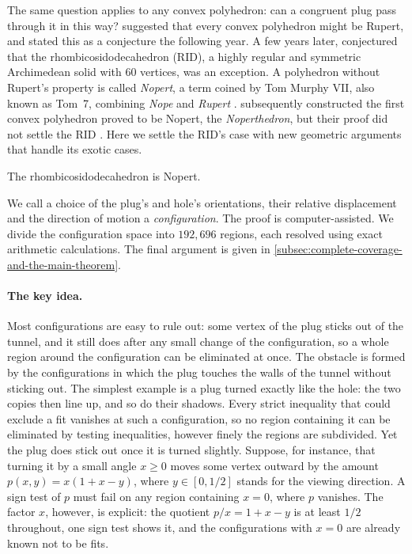 The same question applies to any convex polyhedron: can a congruent plug
pass through it in this way? \citet{JerrardWetzelYuan2017}
suggested that every convex polyhedron might be Rupert, and
\citet{ChaiYuanZamfirescu2018} stated this as a conjecture the following year.
A few years later, \citet{SteiningerYurkevich2023} conjectured that the
rhombicosidodecahedron (RID), a highly regular and symmetric Archimedean
solid with 60 vertices, was an exception. A polyhedron without Rupert's property is called \emph{Nopert}, a term
coined by Tom Murphy VII, also known as Tom~7, combining \emph{Nope} and
\emph{Rupert} \citep[p.~352]{Murphy2025}.
\citet{SteiningerYurkevichNopertV2} subsequently constructed the first convex polyhedron
proved to be Nopert, the \emph{Noperthedron}, but their proof did not settle
the RID \citep[Section~9.1]{SteiningerYurkevichNopertV2}.
Here we settle the RID's case with new geometric arguments that handle
its exotic cases.

\begin{theorem}\label{thm:main}
  The rhombicosidodecahedron is Nopert.
\end{theorem}

We call a choice of the plug's and hole's orientations, their relative displacement
and the direction of motion a \emph{configuration}.
The proof is computer-assisted. We divide the configuration space into
$192{,}696$ regions, each resolved using exact arithmetic calculations.
The final argument is given in
\cref{subsec:complete-coverage-and-the-main-theorem}.

\paragraph{The key idea.}
Most configurations are easy to rule out: some vertex of the plug sticks
out of the tunnel, and it still does after any small change of the
configuration, so a whole region around the configuration can be
eliminated at once. The obstacle is formed by the configurations in which
the plug touches the walls of the tunnel without sticking out. The
simplest example is a plug turned exactly like the hole: the two copies
then line up, and so do their shadows. Every strict inequality that could
exclude a fit vanishes at such a configuration, so no region containing
it can be eliminated by testing inequalities, however finely the regions
are subdivided. Yet the plug does stick out once it is turned slightly.
Suppose, for instance, that turning it by a small angle $x\ge0$ moves some
vertex outward by the amount $p(x,y)=x(1+x-y)$, where $y\in[0,1/2]$ stands
for the viewing direction. A sign test of $p$ must fail on any region
containing $x=0$, where $p$ vanishes. The factor $x$, however, is explicit:
the quotient $p/x=1+x-y$ is at least $1/2$ throughout, one sign test shows
it, and the configurations with $x=0$ are already known not to be fits.

